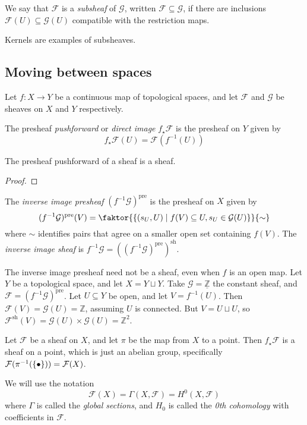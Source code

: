 \begin{definition}
    We say that \( \mathcal F \) is a \emph{subsheaf} of \( \mathcal G \), written \( \mathcal F \subseteq \mathcal G \), if there are inclusions \( \mathcal F(U) \subseteq \mathcal G(U) \) compatible with the restriction maps.
\end{definition}
Kernels are examples of subsheaves.

\subsection{Moving between spaces}
Let \( f : X \to Y \) be a continuous map of topological spaces, and let \( \mathcal F \) and \( \mathcal G \) be sheaves on \( X \) and \( Y \) respectively.
\begin{definition}
    The presheaf \emph{pushforward} or \emph{direct image} \( f_\star \mathcal F \) is the presheaf on \( Y \) given by
    \[ f_\star\mathcal F(U) = \mathcal F(f^{-1}(U)) \]
\end{definition}
\begin{proposition}
    The presheaf pushforward of a sheaf is a sheaf.
\end{proposition}
\begin{proof}
\end{proof}
\begin{definition}
    The \emph{inverse image presheaf} \( (f^{-1} \mathcal G)^{\mathrm{pre}} \) is the presheaf on \( X \) given by
    \[ (f^{-1}\mathcal G)^{\mathrm{pre}}(V) = \faktor{\qty{(s_U, U) \mid f(V) \subseteq U, s_U \in \mathcal G(U)}}{\sim} \]
    where \( \sim \) identifies pairs that agree on a smaller open set containing \( f(V) \).
    The \emph{inverse image sheaf} is \( f^{-1} \mathcal G = ((f^{-1} \mathcal G)^{\mathrm{pre}})^{\mathrm{sh}} \).
\end{definition}
\begin{example}
    The inverse image presheaf need not be a sheaf, even when \( f \) is an open map.
    Let \( Y \) be a topological space, and let \( X = Y \sqcup Y \).
    Take \( \mathcal G = \underline{\mathbb Z} \) the constant sheaf, and \( \mathcal F = (f^{-1} \mathcal G)^{\mathrm{pre}} \).
    Let \( U \subseteq Y \) be open, and let \( V = f^{-1}(U) \).
    Then \( \mathcal F(V) = \mathcal G(U) = \mathbb Z \), assuming \( U \) is connected.
    But \( V = U \sqcup U \), so \( \mathcal F^{\mathrm{sh}}(V) = \mathcal G(U) \times \mathcal G(U) = \mathbb Z^2 \).
\end{example}
\begin{example}
    Let \( \mathcal F \) be a sheaf on \( X \), and let \( \pi \) be the map from \( X \) to a point.
    Then \( f_\star \mathcal F \) is a sheaf on a point, which is just an abelian group, specifically \( \mathcal F(\pi^{-1}(\qty{\bullet})) = \mathcal F(X) \).
\end{example}
We will use the notation
\[ \mathcal F(X) = \Gamma(X, \mathcal F) = H^0(X, \mathcal F) \]
where \( \Gamma \) is called the \emph{global sections}, and \( H_0 \) is called the \emph{0th cohomology} with coefficients in \( \mathcal F \).

